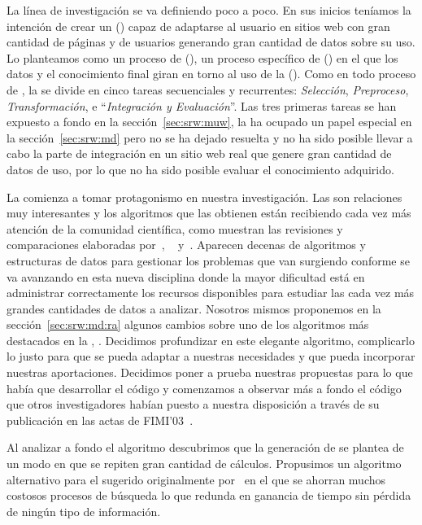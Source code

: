 

La línea de investigación se va definiendo poco a poco. En sus inicios teníamos la intención de crear un \srw (\SRW) capaz de adaptarse al usuario en sitios web con gran cantidad de páginas y de usuarios generando gran cantidad de datos sobre su uso. Lo planteamos como un proceso de \wum (\WUM), un proceso específico de \kdd (\KDD) en el que los datos y el conocimiento final giran en torno al uso de la \www (\WWW). Como en todo proceso de \KDD, la \WUM se divide en cinco tareas secuenciales y recurrentes: \emph{Selección}, \emph{Preproceso}, \emph{Transformación}, \dm e "`\emph{Integración y Evaluación}"'. Las tres primeras tareas se han expuesto a fondo en la sección~\ref{sec:srw:muw}, la \dm ha ocupado un papel especial en la sección~\ref{sec:srw:md} pero no se ha dejado resuelta y no ha sido posible llevar a cabo la parte de integración en un sitio web real que genere gran cantidad de datos de uso, por lo que no ha sido posible evaluar el conocimiento adquirido.

La \dm comienza a tomar protagonismo en nuestra investigación. Las \ARs son relaciones muy interesantes y los algoritmos que las obtienen están recibiendo cada vez más atención de la comunidad científica, como muestran las revisiones y comparaciones elaboradas por~\citet{HippGuntzerNakhaeizadeh-AlgorithmsForAssociationRuleMining-2000}, ~\citet{ZhaoBhowmick-ARMSurvey-2003} y~\citet{Goethals-SurveyOnFPM-2003}. Aparecen decenas de algoritmos y estructuras de datos para gestionar los problemas que van surgiendo conforme se va avanzando en esta nueva disciplina donde la mayor dificultad está en administrar correctamente los recursos disponibles para estudiar las cada vez más grandes cantidades de datos a analizar. Nosotros mismos proponemos en la sección~\ref{sec:srw:md:ra} algunos cambios sobre uno de los algoritmos más destacados en la \arm, \apriori. Decidimos profundizar en este elegante algoritmo, complicarlo lo justo para que se pueda adaptar a nuestras necesidades y que pueda incorporar nuestras aportaciones. Decidimos poner a prueba nuestras propuestas para lo que había que desarrollar el código y comenzamos a observar más a fondo el código que otros investigadores habían puesto a nuestra disposición a través de su publicación en las actas de FIMI'03~\citep{ZakiGoethals-ProceedingsFIMI-2003}.

Al analizar a fondo el algoritmo \apriori descubrimos que la generación de \ars se plantea de un modo en que se repiten gran cantidad de cálculos. Propusimos un algoritmo alternativo para el sugerido originalmente por~\citet{AgrawalSrikant-FastAlgorithmsForMiningAssociationRules-LARGO-1994} en el que se ahorran muchos costosos procesos de búsqueda lo que redunda en ganancia de tiempo sin pérdida de ningún tipo de información.

